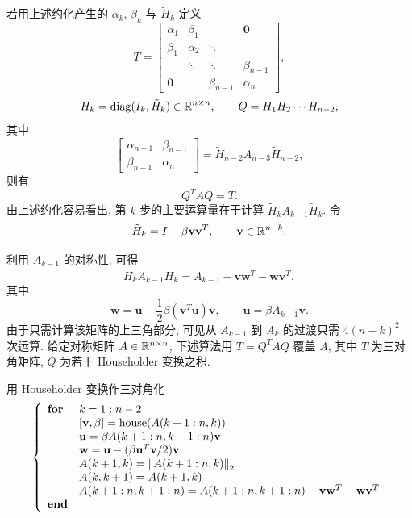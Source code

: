 若用上述约化产生的 $\alpha_k$, $\beta_k$ 与 $\tilde{H}_k$ 定义
\[
  T=\begin{bmatrix}
    \alpha_1 & \beta_1 & & \mathbf{0}\\
    \beta_1 & \alpha_2 & \ddots & \\
     & \ddots & \ddots & \beta_{n-1}\\
    \mathbf{0} & & \beta_{n-1} & \alpha_n
  \end{bmatrix},
\]
\[
  H_k=\operatorname{diag}(I_k,\tilde{H}_k)\in\mathbb{R}^{n\times n},
  \qquad
  Q=H_1H_2\cdots H_{n-2},
\]
其中
\[
  \begin{bmatrix}
    \alpha_{n-1} & \beta_{n-1}\\
    \beta_{n-1} & \alpha_n
  \end{bmatrix}
  =\tilde{H}_{n-2}A_{n-3}\tilde{H}_{n-2},
\]
则有
\[
  Q^TAQ=T.
\]
由上述约化容易看出, 第 $k$ 步的主要运算量在于计算 $\tilde{H}_kA_{k-1}\tilde{H}_k$. 令
\[
  \tilde{H}_k=I-\beta\mathbf{v}\mathbf{v}^T,
  \qquad \mathbf{v}\in\mathbb{R}^{n-k}.
\]

利用 $A_{k-1}$ 的对称性, 可得
\[
  \tilde{H}_kA_{k-1}\tilde{H}_k=A_{k-1}-\mathbf{v}\mathbf{w}^T-\mathbf{w}\mathbf{v}^T,
\]
其中
\[
  \mathbf{w}=\mathbf{u}-\frac{1}{2}\beta(\mathbf{v}^T\mathbf{u})\mathbf{v},
  \qquad
  \mathbf{u}=\beta A_{k-1}\mathbf{v}.
\]
由于只需计算该矩阵的上三角部分, 可见从 $A_{k-1}$ 到 $A_k$ 的过渡只需 $4(n-k)^2$ 次运算. 给定对称矩阵 $A\in\mathbb{R}^{n\times n}$, 下述算法用 $T=Q^TAQ$ 覆盖 $A$, 其中 $T$ 为三对角矩阵, $Q$ 为若干 Householder 变换之积.

\begin{algorithm}{用 Householder 变换作三对角化}
  \label{alg:8-1}
  \[
    \left\{
    \begin{array}{ll}
      \textbf{for} & k=1:n-2\\
        & [\mathbf{v},\beta]=\mathrm{house}(A(k+1:n,k))\\
        & \mathbf{u}=\beta A(k+1:n,k+1:n)\mathbf{v}\\
        & \mathbf{w}=\mathbf{u}-(\beta\mathbf{u}^T\mathbf{v}/2)\mathbf{v}\\
        & A(k+1,k)=\left\|A(k+1:n,k)\right\|_2\\
        & A(k,k+1)=A(k+1,k)\\
        & A(k+1:n,k+1:n)=A(k+1:n,k+1:n)-\mathbf{v}\mathbf{w}^T-\mathbf{w}\mathbf{v}^T\\
      \textbf{end}
    \end{array}
    \right.
  \]
\end{algorithm}

